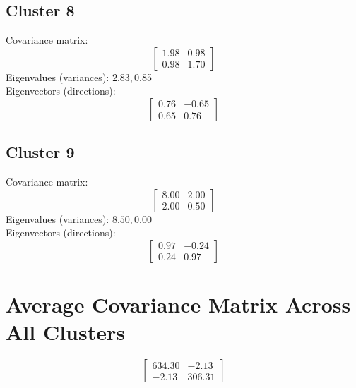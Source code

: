 \documentclass{article}
\begin{document}
\subsection*{Cluster 8}
Covariance matrix:
\[\begin{bmatrix}1.98 & 0.98 \\0.98 & 1.70\end{bmatrix}\]
Eigenvalues (variances): $ 2.83, $0.85\\
Eigenvectors (directions):
\[\begin{bmatrix}0.76 & -0.65 \\0.65 & 0.76\end{bmatrix}\]
\subsection*{Cluster 9}
Covariance matrix:
\[\begin{bmatrix}8.00 & 2.00 \\2.00 & 0.50\end{bmatrix}\]
Eigenvalues (variances): $ 8.50, $0.00\\
Eigenvectors (directions):
\[\begin{bmatrix}0.97 & -0.24 \\0.24 & 0.97\end{bmatrix}\]
\section*{Average Covariance Matrix Across All Clusters}
\[\begin{bmatrix}634.30 & -2.13 \\-2.13 & 306.31\end{bmatrix}\]
\end{document}
